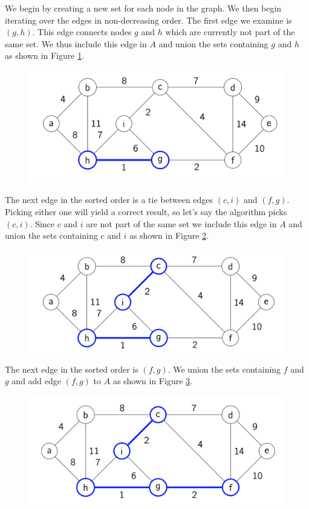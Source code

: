 \documentclass [12pt]{article}
\theoremstyle{definition}
\begin{document}
We begin by creating a new set for each node in the graph. We then begin iterating over the edges in non-decreasing order. The first edge we examine is $(g, h)$. This edge connects nodes $g$ and $h$ which are currently not part of the same set. We thus include this edge in $A$ and union the sets containing $g$ and $h$ as shown in Figure \ref{fig:kruskal1}.

\begin{figure}[h!]
\centering
\includegraphics[scale=0.8]{kruskal1.png}
\caption{}
\label{fig:kruskal1}
\end{figure}

The next edge in the sorted order is a tie between edges $(c, i)$ and $(f , g)$. Picking either one will yield a correct result, so let’s say the algorithm picks $(c, i)$. Since $c$ and $i$ are not part of the same set we include this edge in $A$ and union the sets containing $c$ and $i$ as shown in Figure \ref{fig:kruskal2}.

\begin{figure}[h!]
\centering
\includegraphics[scale=0.8]{kruskal2.png}
\caption{}
\label{fig:kruskal2}
\end{figure}



The next edge in the sorted order is $(f , g)$. We union the sets containing $f$ and $g$ and add edge $(f , g)$ to $ A$ as shown in Figure \ref{fig:kruskal3}.


\begin{figure}[h!]
\centering
\includegraphics[scale=0.8]{kruskal3.png}
\caption{}
\label{fig:kruskal3}
\end{figure}
\end{document}
